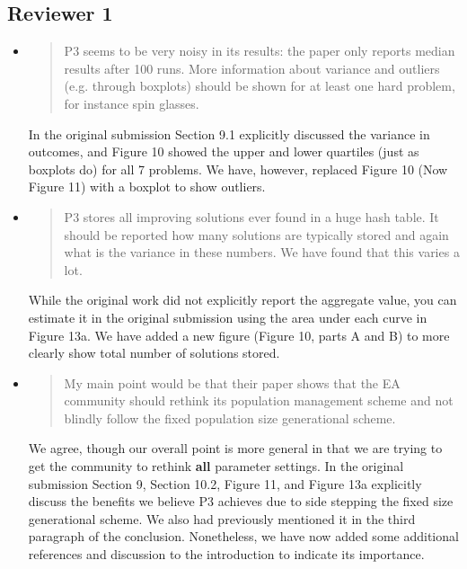 \documentclass[]{article}
\begin{document}
\subsection{Reviewer 1}
\begin{itemize}

\item
\begin{quote}
P3 seems to be very noisy in its results: the paper only reports median results after 100 runs. More information about variance and outliers (e.g. through boxplots) should be shown for at least one hard problem, for instance spin glasses. 
\end{quote}

In the original submission Section 9.1 explicitly discussed the variance in outcomes,
and Figure 10 showed the upper and lower quartiles (just as boxplots do) for all 7 problems.
We have, however, replaced Figure 10 (Now Figure 11) with a boxplot to show outliers.

\item
\begin{quote}
P3 stores all improving solutions ever found in a huge hash table. It should be reported how many solutions are typically stored and again what is the variance in these numbers. We have found that this varies a lot. 
\end{quote}

While the original work did not explicitly report the aggregate value,
you can estimate it in the original submission using the area under each curve in Figure 13a.
We have added a new figure (Figure 10, parts A and B) to more clearly show total number of solutions stored.

\item
\begin{quote}
My main point would be that their paper shows that the EA community should rethink its population management scheme and not blindly follow the fixed population size generational scheme.
\end{quote}

We agree, though our overall point is more general in that we are trying to get the community to rethink
\textbf{all} parameter settings. In the original submission Section 9, Section 10.2,
Figure 11, and Figure 13a explicitly discuss the benefits we believe P3 achieves due
to side stepping the fixed size generational scheme.
We also had previously mentioned it in the third paragraph of the conclusion.
Nonetheless, we have now added some additional references and discussion to the introduction to indicate its importance.


\end{itemize}
\end{document}
